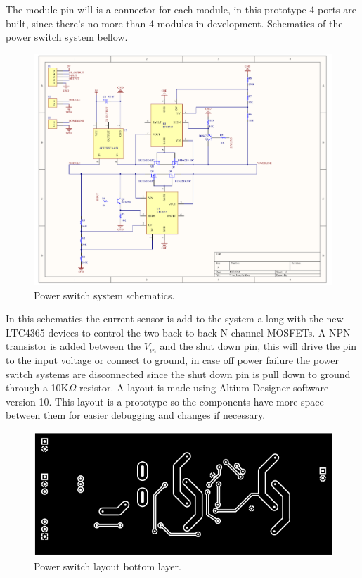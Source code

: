 The module pin will is a connector for each module, in this prototype 4 ports are built, since there's no more than 4 modules in development.
%
Schematics of the power switch system bellow.
\begin{figure}[H]
	\begin{centering}
		\includegraphics[width=1.0\textwidth]{images/PS_PCB.pdf}
		\caption{Power switch system schematics.}
	\end{centering}
\end{figure}
In this schematics the current sensor is add to the system a long with the new LTC4365 devices to control the two back to back N-channel MOSFETs. A NPN transistor is added between the $ V_{in} $ and the shut down pin, this will drive the pin to the input voltage or connect to ground, in case off power failure the power switch systems are disconnected since the shut down pin is pull down to ground through a 10K$ \Omega $ resistor.
A layout is made using Altium Designer software version 10. This layout is a prototype so the components have more space between them for easier debugging and changes if necessary.
\begin{figure}[H]
	\begin{centering}
		\includegraphics[width=1.0\textwidth]{images/tb5_layout_bottom.png}
		\caption{Power switch layout bottom layer.}
	\end{centering}
\end{figure}
